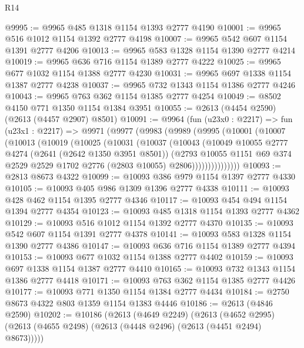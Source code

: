 \begin{lexlean}{R14}
\begin{coremodule}
@9995 := @9965 @485 @1318 @1154 @1393 @2777 @4190
@10001 := @9965 @516 @1012 @1154 @1392 @2777 @4198
@10007 := @9965 @542 @607 @1154 @1391 @2777 @4206
@10013 := @9965 @583 @1328 @1154 @1390 @2777 @4214
@10019 := @9965 @636 @716 @1154 @1389 @2777 @4222
@10025 := @9965 @677 @1032 @1154 @1388 @2777 @4230
@10031 := @9965 @697 @1338 @1154 @1387 @2777 @4238
@10037 := @9965 @732 @1343 @1154 @1386 @2777 @4246
@10043 := @9965 @763 @362 @1154 @1385 @2777 @4254
@10049 := @8502 @4150 @771 @1350 @1154 @1384 @3951
@10055 := @2613 (@4454 @2590) (@2613 (@4457 @2907) @8501)
@10091 := @9964
    (fun (u23x0 : @2217) =>
    fun (u23x1 : @2217) =>
    @9971
      (@9977
        (@9983
          (@9989
            (@9995
              (@10001
                (@10007
                  (@10013
                    (@10019
                      (@10025
                        (@10031
                          (@10037
                            (@10043
                              (@10049
                                @10055
                                @2777
                                @4274
                                (@2641 (@2642 @1350 @3951 @8501))
                                (@2793
                                  @10055
                                  @1151
                                  @69
                                  @374
                                  @2529
                                  @2529
                                  @1702
                                  @2776
                                  (@2803 @10055)
                                  @2806)))))))))))))))
@10093 := @2813 @8673 @4322
@10099 := @10093 @386 @979 @1154 @1397 @2777 @4330
@10105 := @10093 @405 @986 @1309 @1396 @2777 @4338
@10111 := @10093 @428 @462 @1154 @1395 @2777 @4346
@10117 := @10093 @454 @494 @1154 @1394 @2777 @4354
@10123 := @10093 @485 @1318 @1154 @1393 @2777 @4362
@10129 := @10093 @516 @1012 @1154 @1392 @2777 @4370
@10135 := @10093 @542 @607 @1154 @1391 @2777 @4378
@10141 := @10093 @583 @1328 @1154 @1390 @2777 @4386
@10147 := @10093 @636 @716 @1154 @1389 @2777 @4394
@10153 := @10093 @677 @1032 @1154 @1388 @2777 @4402
@10159 := @10093 @697 @1338 @1154 @1387 @2777 @4410
@10165 := @10093 @732 @1343 @1154 @1386 @2777 @4418
@10171 := @10093 @763 @362 @1154 @1385 @2777 @4426
@10177 := @10093 @771 @1350 @1154 @1384 @2777 @4434
@10184 := @2750 @8673 @4322 @803 @1359 @1154 @1383 @4446
@10186 := @2613 (@4846 @2590)
@10202 := @10186
    (@2613
      (@4649 @2249)
      (@2613 (@4652 @2995) (@2613 (@4655 @2498) (@2613 (@4448 @2496) (@2613 (@4451 @2494) @8673)))))

\end{coremodule}
\end{lexlean}
